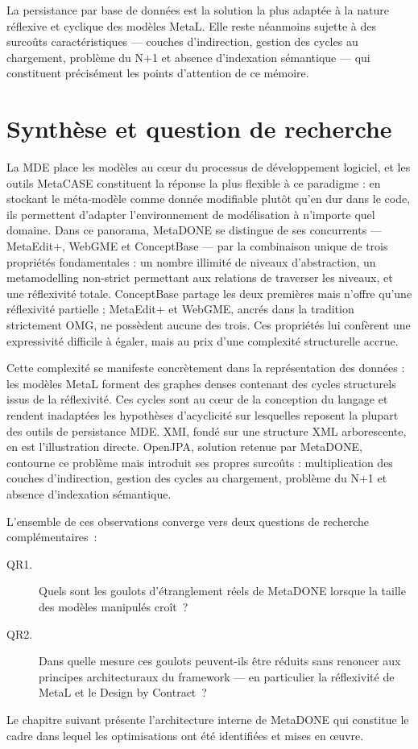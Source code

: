 La persistance par base de données est la solution la plus adaptée à la nature réflexive et cyclique des modèles MetaL. Elle reste néanmoins sujette à des surcoûts caractéristiques --- couches d'indirection, gestion des cycles au chargement, problème du N+1 et absence d'indexation sémantique --- qui constituent précisément les points d'attention de ce mémoire.

\section{Synthèse et question de recherche}
\label{sec:synthese-question}

La MDE place les modèles au cœur du processus de développement logiciel, et les outils MetaCASE constituent la réponse la plus flexible à ce paradigme : en stockant le méta-modèle comme donnée modifiable plutôt qu'en dur dans le code, ils permettent d'adapter l'environnement de modélisation à n'importe quel domaine. Dans ce panorama, MetaDONE se distingue de ses concurrents — MetaEdit+, WebGME et ConceptBase — par la combinaison unique de trois propriétés fondamentales : un nombre illimité de niveaux d'abstraction, un metamodelling non-strict permettant aux relations de traverser les niveaux, et une réflexivité totale. ConceptBase partage les deux premières mais n'offre qu'une réflexivité partielle ; MetaEdit+ et WebGME, ancrés dans la tradition strictement OMG, ne possèdent aucune des trois. Ces propriétés lui confèrent une expressivité difficile à égaler, mais au prix d'une complexité structurelle accrue.

Cette complexité se manifeste concrètement dans la représentation des données : les modèles MetaL forment des graphes denses contenant des cycles structurels issus de la réflexivité. Ces cycles sont au cœur de la conception du langage et rendent inadaptées les hypothèses d'acyclicité sur lesquelles reposent la plupart des outils de persistance MDE. XMI, fondé sur une structure XML arborescente, en est l'illustration directe. OpenJPA, solution retenue par MetaDONE, contourne ce problème mais introduit ses propres surcoûts : multiplication des couches d'indirection, gestion des cycles au chargement, problème du N+1 et absence d'indexation sémantique.

L'ensemble de ces observations converge vers deux questions de recherche complémentaires~:
\begin{description}
    \item[QR1.] Quels sont les goulots d'étranglement réels de MetaDONE lorsque la taille des modèles manipulés croît~?
    \item[QR2.] Dans quelle mesure ces goulots peuvent-ils être réduits sans renoncer aux principes architecturaux du framework — en particulier la réflexivité de MetaL et le Design by Contract~?
\end{description}
Le chapitre suivant présente l'architecture interne de MetaDONE qui constitue le cadre dans lequel les optimisations ont été identifiées et mises en œuvre.